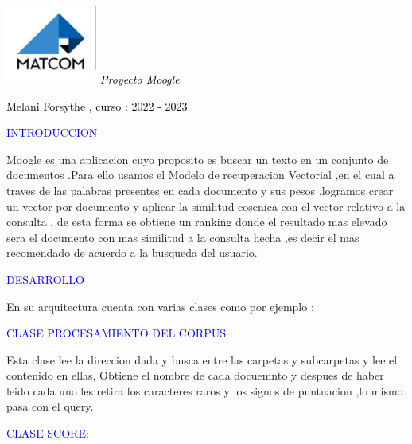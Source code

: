 \documentclass{article}
\begin{document}
\begin{center}

\includegraphics[width = 3cm ]{matcom.jpg.jpeg}
\Huge \em 
\textcolor {black}{Proyecto Moogle}

\huge \textcolor {black} {Melani Forsythe , curso : 2022 - 2023 } 

\vspace{0.5cm}

\end{center}

\Large \textcolor {blue}{INTRODUCCION}

\vspace{0.5cm}

Moogle es una aplicacion cuyo proposito es buscar un texto en un conjunto de documentos .Para ello usamos el Modelo de recuperacion Vectorial ,en el cual a traves de las palabras presentes en cada documento y sus pesos ,logramos crear un vector por documento y aplicar la similitud cosenica con el vector relativo a la consulta , de esta forma se obtiene un ranking donde el resultado mas elevado sera el documento con mas similitud a la consulta hecha ,es decir el mas recomendado de acuerdo a la busqueda del usuario.
\vspace{1.0cm}

\Large \textcolor{blue}{ DESARROLLO}

\vspace{0.5cm}

En su arquitectura cuenta con varias clases como por ejemplo :
\vspace {0.5cm }

\large \textcolor {blue}{CLASE PROCESAMIENTO DEL CORPUS }:

\vspace {0.3cm}

Esta clase lee la direccion dada y busca entre las carpetas y subcarpetas y lee el contenido en ellas,
Obtiene el nombre de cada docuemnto y despues de haber leido cada uno les retira los caracteres raros y los signos de puntuacion ,lo mismo pasa con el query.

\vspace{0.5cm}

\large \textcolor {blue}{CLASE SCORE}: 
\end{document}
